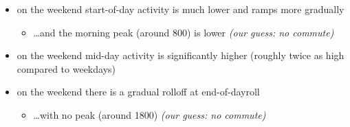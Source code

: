 \documentclass[]{article}
\providecommand{\tightlist}{%
  \setlength{\itemsep}{0pt}\setlength{\parskip}{0pt}}
\begin{document}
\begin{itemize}
\tightlist
\item
  on the weekend start-of-day activity is much lower and ramps more
  gradually

  \begin{itemize}
  \tightlist
  \item
    \ldots{}and the morning peak (around 800) is lower \emph{(our guess:
    no commute)}\\
  \end{itemize}
\item
  on the weekend mid-day activity is significantly higher (roughly twice
  as high compared to weekdays)\\
\item
  on the weekend there is a gradual rolloff at end-of-dayroll

  \begin{itemize}
  \tightlist
  \item
    \ldots{}with no peak (around 1800) \emph{(our guess: no commute)}
  \end{itemize}
\end{itemize}
\end{document}
